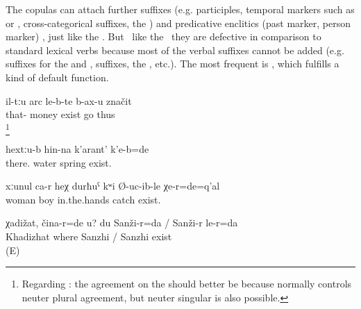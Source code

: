 The copulas can attach further suffixes (e.g. participles, temporal markers such as  or , cross-categorical suffixes, the  )  and predicative enclitics (past marker, person marker) , just like the . But \tnd\ like the  \tnd\ they are defective in comparison to standard lexical verbs because most of the verbal suffixes cannot be added (e.g. suffixes for the  and ,  suffixes, the , etc.). The most frequent  is , which fulfills a kind of default function.
%
\begin{exe}
	\ex	\label{ex:This means that (people) go where the money is}
	\gll	il-tːu	arc	le-b-te 	b-ax-u	značit\\
		that-	money	exist 	go	thus\\
	\glt	{}\footnote{Regarding : the agreement on the  should better be  because   normally controls neuter plural agreement, but neuter singular is also possible.}

	\ex	\label{ex:There was a spring up there}
	\gll	hextːu-b	hin-na	k'arant'	k'e-b=de\\
		there.	water	spring	exist.\\
	\glt	{}

	\ex	\label{ex:That is the woman, the one who was keeping the boy in here hands}
	\gll	xːunul	ca-r	heχ	durħuˁ	kʷi	Ø-uc-ib-le	χe-r=de=q'al\\
		woman			boy	in.the.hands	catch	exist.\\
	\glt	{}

	\ex	\label{ex:‎Khadizhat, where are you? I am in Sanzhi_1}
	\gll	χadižat,	čina-r=de	u?	du	Sanži-r=da	/	Sanži-r	le-r=da\\
		Khadizhat	where			Sanzhi	/ Sanzhi exist\\
	\glt	{} (E)

\end{exe}

